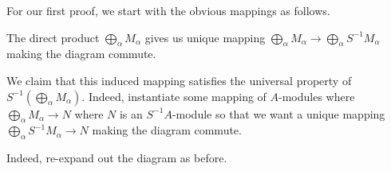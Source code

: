 For our first proof, we start with the obvious mappings as follows.
\begin{center}
\end{center}
The direct product $\bigoplus_\alpha M_\alpha$ gives us unique mapping $\bigoplus_\alpha M_\alpha\to\bigoplus_\alpha S^{-1}M_\alpha$ making the diagram commute.
\begin{center}
\end{center}
We claim that this induced mapping satisfies the universal property of $S^{-1}\left(\bigoplus_\alpha M_\alpha\right).$ Indeed, instantiate some mapping of $A$-modules where $\bigoplus_\alpha M_\alpha\to N$ where $N$ is an $S^{-1}A$-module so that we want a unique mapping $\bigoplus_\alpha S^{-1}M_\alpha\to N$ making the diagram commute.
\begin{center}
\end{center}
Indeed, re-expand out the diagram as before.
\begin{center}
\end{center}
